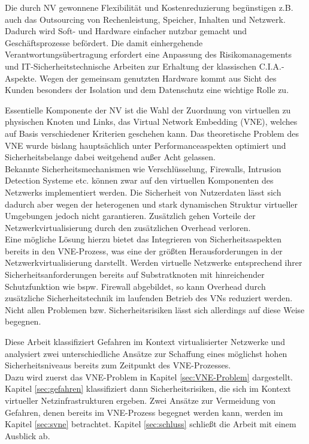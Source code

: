 Die durch NV gewonnene Flexibilität und Kostenreduzierung begünstigen z.B. auch das Outsourcing von Rechenleistung, Speicher, Inhalten und Netzwerk. Dadurch wird Soft- und Hardware einfacher nutzbar gemacht und Geschäftsprozesse befördert. 
Die damit einhergehende Verantwortungsübertragung erfordert eine Anpassung des Risikomanagements und IT-Sicherheitstechnische Arbeiten zur Erhaltung der klassischen C.I.A.-Aspekte. Wegen der gemeinsam genutzten Hardware kommt aus Sicht des Kunden besonders der Isolation und dem Datenschutz eine wichtige Rolle zu.

Essentielle Komponente der NV ist die Wahl der Zuordnung von virtuellen zu physischen Knoten und Links, das Virtual Network Embedding (VNE), welches auf Basis verschiedener Kriterien geschehen kann. Das theoretische Problem des VNE wurde bislang hauptsächlich unter Performanceaspekten optimiert und Sicherheitsbelange dabei weitgehend außer Acht gelassen.\\
Bekannte Sicherheitsmechanismen wie Verschlüsselung, Firewalls, Intrusion Detection Systeme etc. können zwar auf den virtuellen Komponenten des Netzwerks implementiert werden. Die Sicherheit von Nutzerdaten lässt sich dadurch aber wegen der heterogenen und stark dynamischen Struktur virtueller Umgebungen jedoch nicht garantieren. Zusätzlich gehen Vorteile der Netzwerkvirtualisierung durch den zusätzlichen Overhead verloren. \cite{gong2016virtual}\\
Eine mögliche Lösung hierzu bietet das Integrieren von Sicherheitsaspekten bereits in den VNE-Prozess, was eine der größten Herausforderungen in der Netzwerkvirtualisierung darstellt. \cite{fischer2013virtual}
Werden virtuelle Netzwerke entsprechend ihrer Sicherheitsanforderungen bereits auf Substratknoten mit hinreichender Schutzfunktion wie bspw. Firewall abgebildet, so kann Overhead durch zusätzliche Sicherheitstechnik im laufenden Betrieb des VNs reduziert werden. Nicht allen Problemen bzw. Sicherheitsrisiken lässt sich allerdings auf diese Weise begegnen. \cite{bays2012security, gong2016virtual, wang2016towards} 


Diese Arbeit klassifiziert Gefahren im Kontext virtualisierter Netzwerke und analysiert zwei unterschiedliche Ansätze zur Schaffung eines möglichst hohen Sicherheitsniveaus bereits zum Zeitpunkt des VNE-Prozesses.\\
Dazu wird zuerst das VNE-Problem in Kapitel \ref{sec:VNE-Problem} dargestellt. Kapitel \ref{sec:gefahren} klassifiziert dann Sicherheitsrisiken, die sich im Kontext virtueller Netzinfrastrukturen ergeben. Zwei Ansätze zur Vermeidung von Gefahren, denen bereits im VNE-Prozess begegnet werden kann, werden im Kapitel \ref{sec:svne} betrachtet. Kapitel \ref{sec:schluss} schließt die Arbeit mit einem Ausblick ab.